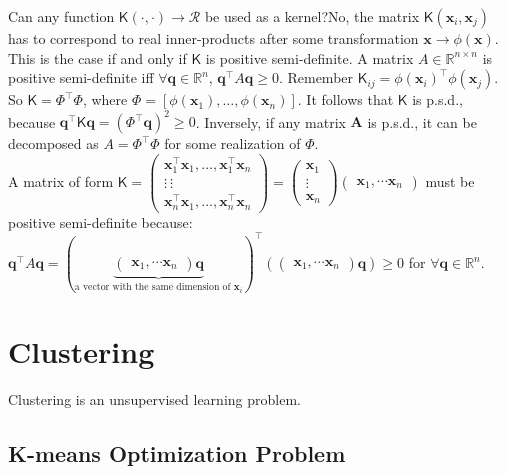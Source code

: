 \documentclass[12pt]{article}
\begin{document}
Can any function $\mathsf{K}(\cdot,\cdot)\rightarrow{\mathcal{R}}$ be used as a kernel?No, the matrix $\mathsf{K}(\mathbf{x}_i,\mathbf{x}_j)$ has to correspond to real inner-products after some transformation ${\mathbf{x}}\rightarrow \phi({\mathbf{x}})$. This is the case if and only if $\mathsf{K}$ is positive semi-definite. A matrix $A\in \mathbb{R}^{n\times n}$ is positive semi-definite iff $\forall \mathbf{q}\in\mathbb{R}^n$, $\mathbf{q}^\top A\mathbf{q}\geq 0$.
Remember $\mathsf{K}_{ij}=\phi(\mathbf{x}_i)^\top \phi(\mathbf{x}_j)$. So $\mathsf{K}=\Phi^\top\Phi$, where $\Phi=[\phi(\mathbf{x}_1),\dots,\phi(\mathbf{x}_n)]$.
It follows that $\mathsf{K}$ is p.s.d., because $\mathbf{q}^\top\mathsf{K}\mathbf{q}=(\Phi^\top \mathbf{q})^2\geq 0$. Inversely, if any matrix $\mathbf{A}$ is p.s.d., it can be decomposed as $A=\Phi^\top\Phi$ for some realization of $\Phi$. \\
A matrix of form $\mathsf{K}=\begin{pmatrix} \mathbf{x}_1^\top \mathbf{x}_1, ..., \mathbf{x}_1^\top \mathbf{x}_n \\ \vdots ~ \vdots \\ \mathbf{x}_n^\top \mathbf{x}_1, ..., \mathbf{x}_n^\top \mathbf{x}_n \end{pmatrix}=\begin{pmatrix} \mathbf{x}_1\\ \vdots \\ \mathbf{x}_n \end{pmatrix} \begin{pmatrix} \mathbf{x}_1, \cdots \mathbf{x}_n \end{pmatrix}$  must be positive semi-definite because:
 $\mathbf{q}^\top A\mathbf{q}=(\underbrace{\begin{pmatrix} \mathbf{x}_1, \cdots \mathbf{x}_n \end{pmatrix}\mathbf{q}}_{\text{a vector with the same dimension of } \mathbf{x}_i})^\top (\begin{pmatrix} \mathbf{x}_1, \cdots \mathbf{x}_n \end{pmatrix}\mathbf{q})\geq 0$ for $\forall \mathbf{q}\in\mathbb{R}^n$. 
 
 
 
 \section{Clustering}
 Clustering is an unsupervised learning problem.
 
 
 \subsection{K-means Optimization Problem}
 
\end{document}
